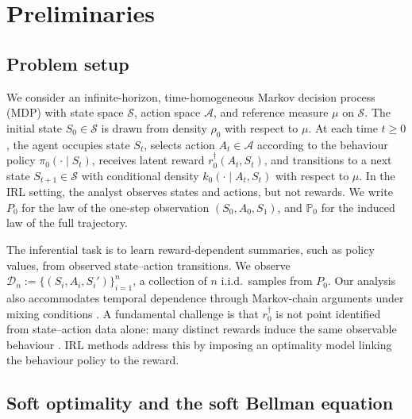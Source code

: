 \documentclass[12pt]{article}
\theoremstyle{plain}
\begin{document}
 

 

 
 
\section{Preliminaries}

\subsection{Problem setup} 
\label{sec::setup}

We consider an infinite-horizon, time-homogeneous Markov decision process (MDP) with state space \(\mathcal S\), action space \(\mathcal A\), and reference measure \(\mu\) on \(\mathcal S\). The initial state \(S_0\in\mathcal S\) is drawn from density \(\rho_0\) with respect to \(\mu\). At each time \(t\geq 0\), the agent occupies state \(S_t\), selects action \(A_t\in\mathcal A\) according to the behaviour policy \(\pi_0(\cdot\mid S_t)\), receives latent reward \(r_0^\dagger(A_t,S_t)\), and transitions to a next state \(S_{t+1}\in\mathcal S\) with conditional density \(k_0(\cdot\mid A_t,S_t)\) with respect to \(\mu\). In the IRL setting, the analyst observes states and actions, but not rewards. We write \(P_0\) for the law of the one-step observation \((S_0,A_0,S_1)\), and \(\mathbb P_0\) for the induced law of the full trajectory.



The inferential task is to learn reward-dependent summaries, such as policy
values, from observed state--action transitions. We observe
\(\mathcal{D}_n := \{(S_i, A_i, S_i')\}_{i=1}^n\), a collection of \(n\) i.i.d.\
samples from \(P_0\). Our analysis also accommodates temporal dependence through Markov-chain arguments under mixing conditions \citep{bibaut2021sequential,mehrabi2024off}.
  A fundamental challenge
is that \(r_0^\dagger\) is not point identified from state--action data alone:
many distinct rewards induce the same observable behaviour
\citep{ng1999policy,ng2000algorithms}. IRL methods address this by imposing an
optimality model linking the behaviour policy to the reward.

 
 

\subsection{Soft optimality and the soft Bellman equation}
\end{document}
